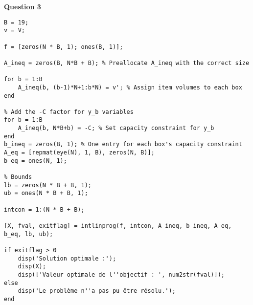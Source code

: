 \textbf{Question 3}
\begin{verbatim}
B = 19;
v = V;

f = [zeros(N * B, 1); ones(B, 1)];

A_ineq = zeros(B, N*B + B); % Preallocate A_ineq with the correct size

for b = 1:B
    A_ineq(b, (b-1)*N+1:b*N) = v'; % Assign item volumes to each box
end

% Add the -C factor for y_b variables
for b = 1:B
    A_ineq(b, N*B+b) = -C; % Set capacity constraint for y_b
end
b_ineq = zeros(B, 1); % One entry for each box's capacity constraint
A_eq = [repmat(eye(N), 1, B), zeros(N, B)];
b_eq = ones(N, 1);

% Bounds
lb = zeros(N * B + B, 1);
ub = ones(N * B + B, 1);

intcon = 1:(N * B + B);

[X, fval, exitflag] = intlinprog(f, intcon, A_ineq, b_ineq, A_eq, b_eq, lb, ub);

if exitflag > 0
    disp('Solution optimale :');
    disp(X);
    disp(['Valeur optimale de l''objectif : ', num2str(fval)]);
else
    disp('Le problème n''a pas pu être résolu.');
end
\end{verbatim}

